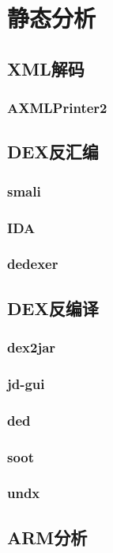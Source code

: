 \chapter{静态分析}

\section{XML解码}
\subsection{AXMLPrinter2}

\section{DEX反汇编}
\subsection{smali}
\subsection{IDA}
\subsection{dedexer}

\section{DEX反编译}
\subsection{dex2jar}
\subsection{jd-gui}
\subsection{ded}
\subsection{soot}
\subsection{undx}

\section{ARM分析}

